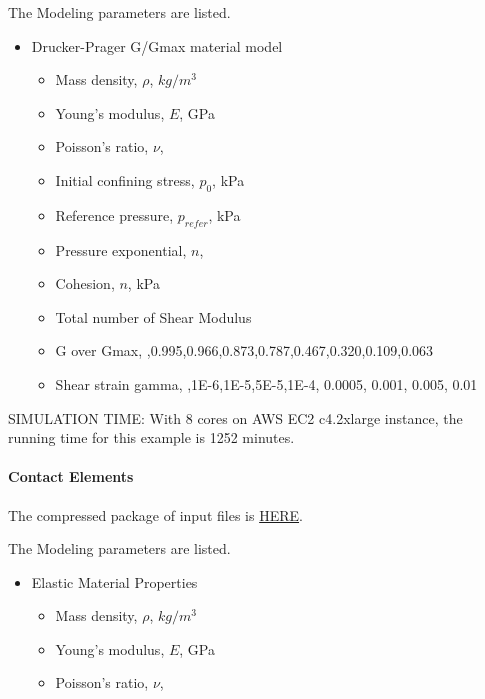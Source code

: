 The Modeling parameters are listed.
\begin{itemize}
  \item Drucker-Prager G/Gmax material model 
  \begin{itemize}
    \item Mass density, $\rho$, \enspace {} $kg/m^3$
    \item Young's modulus, $E$, \enspace {} GPa
    \item Poisson's ratio, $\nu$, \enspace {}
    \item Initial confining stress, $p_0$, \enspace {} kPa
    \item Reference pressure, $p_{refer} $, \enspace {} kPa
    \item Pressure exponential, $ n  $, \enspace {}
    \item Cohesion, $ n  $, \enspace {} kPa
    \item Total number of Shear Modulus \enspace {}
    \item G over Gmax, \enspace {},0.995,0.966,0.873,0.787,0.467,0.320,0.109,0.063
    \item Shear strain gamma, \enspace {},1E-6,1E-5,5E-5,1E-4, 0.0005, 0.001, 0.005, 0.01
  \end{itemize}
\end{itemize}

SIMULATION TIME: With 8 cores on AWS EC2 c4.2xlarge instance, the running time for this example is 1252 minutes.


\paragraph{Contact Elements}
The compressed package of input files is  
\href{https://github.com/yuan-energy/Real-ESSI-Short-Course-Examples/tree/master/short-course-examples/nonlinear_analysis_steps/soil-foundation/contact/contact.tgz?raw=true}{HERE}. 


The Modeling parameters are listed.
\begin{itemize}
  \item Elastic Material Properties 
  \begin{itemize}
    \item Mass density, $\rho$, \enspace {} $kg/m^3$
    \item Young's modulus, $E$, \enspace {} GPa
    \item Poisson's ratio, $\nu$, \enspace {}
  \end{itemize}
\end{itemize}

